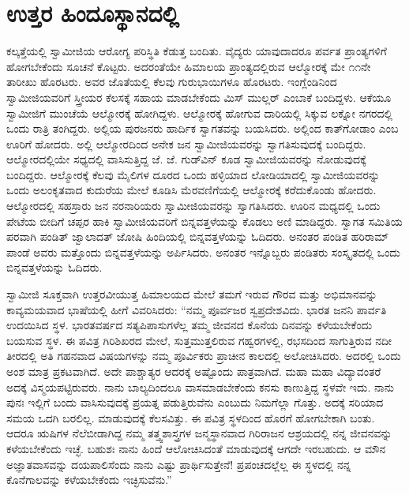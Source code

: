 
\chapter{ಉತ್ತರ ಹಿಂದೂಸ್ಥಾನದಲ್ಲಿ}

 ಕಲ್ಕತ್ತೆಯಲ್ಲಿ ಸ್ವಾಮೀಜಿಯ ಆರೋಗ್ಯ ಪರಿಸ್ಥಿತಿ ಕೆಡುತ್ತ ಬಂದಿತು. ವೈದ್ಯರು ಯಾವುದಾದರೂ ಪರ್ವತ ಪ್ರಾಂತ್ಯಗಳಿಗೆ ಹೋಗಬೇಕೆಂದು ಸೂಚನೆ ಕೊಟ್ಟರು. ಅದರಂತೆಯೇ ಹಿಮಾಲಯ ಪ್ರಾಂತ್ಯದಲ್ಲಿರುವ ಆಲ್ಮೋರಕ್ಕೆ ಮೇ ೧೧ನೇ ತಾರೀಖು ಹೊರಟರು. ಅವರ ಜೊತೆಯಲ್ಲಿ ಕೆಲವು ಗುರುಭಾಯಿಗಳೂ ಹೊರಟರು. ಇಂಗ್ಲೆಂಡಿನಿಂದ ಸ್ವಾಮೀಜಿಯವರಿಗೆ ಸ್ತ್ರೀಯರ ಕೆಲಸಕ್ಕೆ ಸಹಾಯ ಮಾಡಬೇಕೆಂದು ಮಿಸ್ ಮುಲ್ಲರ್ ಎಂಬಾಕೆ ಬಂದಿದ್ದಳು. ಆಕೆಯೂ ಸ್ವಾಮೀಜಿಗೆ ಮುಂಚೆಯೆ ಆಲ್ಮೋರಕ್ಕೆ ಹೋಗಿದ್ದಳು. ಆಲ್ಮೋರಕ್ಕೆ ಹೋಗುವ ದಾರಿಯಲ್ಲಿ ಸಿಕ್ಕುವ ಲಕ್ನೋ ನಗರದಲ್ಲಿ ಒಂದು ರಾತ್ರಿ ತಂಗಿದ್ದರು. ಅಲ್ಲಿಯ ಪುರಜನರು ಹಾರ್ದಿಕ ಸ್ವಾಗತವನ್ನು ಬಯಸಿದರು. ಅಲ್ಲಿಂದ ಕಾತ್‍ಗೋಡಾಂ ಎಂಬ ಊರಿಗೆ ಹೋದರು. ಅಲ್ಲಿ ಆಲ್ಮೋರದಿಂದ ಅನೇಕ ಜನ ಸ್ವಾಮೀಜಿಯವರನ್ನು ಸ್ವಾಗತಿಸುವುದಕ್ಕೆ ಬಂದಿದ್ದರು. ಆಲ್ಮೋರದಲ್ಲಿಯೇ ಸಧ್ಯದಲ್ಲಿ ವಾಸಿಸುತ್ತಿದ್ದ ಜೆ. ಜೆ. ಗುಡ್‍ವಿನ್ ಕೂಡ ಸ್ವಾಮೀಜಿಯವರನ್ನು ನೋಡುವುದಕ್ಕೆ ಬಂದಿದ್ದರು. ಆಲ್ಮೋರಕ್ಕೆ ಕೆಲವು ಮೈಲಿಗಳ ದೂರದ ಒಂದು ಹಳ್ಳಿಯಾದ ಲೋಡಿಯಾದಲ್ಲಿ ಸ್ವಾಮೀಜಿಯವರನ್ನು ಒಂದು ಅಲಂಕೃತವಾದ ಕುದುರೆಯ ಮೇಲೆ ಕೂಡಿಸಿ ಮೆರವಣಿಗೆಯಲ್ಲಿ ಆಲ್ಮೋರಕ್ಕೆ ಕರೆದುಕೊಂಡು ಹೋದರು. ಆಲ್ಮೋರದಲ್ಲಿ ಸಹಸ್ರಾರು ಜನ ನರನಾರಿಯರು ಸ್ವಾಮೀಜಿಯವರನ್ನು ಸ್ವಾಗತಿಸಿದರು. ಊರಿನ ಮಧ್ಯದಲ್ಲಿ ಒಂದು ಪೇಟೆಯ ಬೀದಿಗೆ ಚಪ್ಪರ ಹಾಕಿ ಸ್ವಾಮೀಜಿಯವರಿಗೆ ಬಿನ್ನವತ್ತಳೆಯನ್ನು ಕೊಡಲು ಅಣಿ ಮಾಡಿದ್ದರು. ಸ್ವಾಗತ ಸಮಿತಿಯ ಪರವಾಗಿ ಪಂಡಿತ್ ಜ್ವಾಲಾದತ್ ಜೋಷಿ ಹಿಂದಿಯಲ್ಲಿ ಬಿನ್ನವತ್ತಳೆಯನ್ನು ಓದಿದರು. ಅನಂತರ ಪಂಡಿತ ಹರಿರಾಮ್ ಪಾಂಡೆ ಅವರು ಮತ್ತೊಂದು ಬಿನ್ನವತ್ತಳೆಯನ್ನು ಅರ್ಪಿಸಿದರು. ಅನಂತರ ಇನ್ನೊಬ್ಬರು ಪಂಡಿತರು ಸಂಸ್ಕೃತದಲ್ಲಿ ಒಂದು ಬಿನ್ನವತ್ತಳೆಯನ್ನು ಓದಿದರು. 

 ಸ್ವಾಮೀಜಿ ಸೂಕ್ತವಾಗಿ ಉತ್ತರವೀಯುತ್ತ ಹಿಮಾಲಯದ ಮೇಲೆ ತಮಗೆ ಇರುವ ಗೌರವ ಮತ್ತು ಅಭಿಮಾನವನ್ನು ಕಾವ್ಯಮಯವಾದ ಭಾಷೆಯಲ್ಲಿ ಹೀಗೆ ವಿವರಿಸಿದರು: “ನಮ್ಮ ಪೂರ್ವಜರ ಸ್ವಪ್ರದೇಶವಿದು. ಭಾರತ ಜನನಿ ಪಾರ್ವತಿ ಉದಯಿಸಿದ ಸ್ಥಳ. ಭಾರತವರ್ಷದ ಸತ್ಯಪಿಪಾಸುಗಳೆಲ್ಲ ತಮ್ಮ ಜೀವನದ ಕೊನೆಯ ದಿನವನ್ನು ಕಳೆಯಬೇಕೆಂದು ಬಯಸುವ ಸ್ಥಳ. ಈ ಪವಿತ್ರ ಗಿರಿಶಿಖರದ ಮೇಲೆ, ಸುತ್ತಮುತ್ತಲಿರುವ ಗಹ್ವರಗಳಲ್ಲಿ, ರಭಸದಿಂದ ಸಾಗುತ್ತಿರುವ ನದೀ ತೀರದಲ್ಲಿ ಅತಿ ಗಹನವಾದ ವಿಷಯಗಳನ್ನು ನಮ್ಮ ಪೂರ್ವಿಕರು ಪ್ರಾಚೀನ ಕಾಲದಲ್ಲಿ ಅಲೋಚಿಸಿದರು. ಅದರಲ್ಲಿ ಒಂದು ಅಂಶ ಮಾತ್ರ ಪ್ರಕಟವಾಗಿದೆ. ಅದೇ ಪಾಶ್ಚಾತ್ಯರ ಆದರಕ್ಕೆ ಅಷ್ಟೊಂದು ಪಾತ್ರವಾಗಿದೆ. ಮಹಾ ಮಹಾ ವಿದ್ಯಾವಂತರೆ ಅದಕ್ಕೆ ವಿಸ್ಮಯಪಟ್ಟಿರುವರು. ನಾನು ಬಾಲ್ಯದಿಂದಲೂ ವಾಸಮಾಡಬೇಕೆಂದು ಕನಸು ಕಾಣುತ್ತಿದ್ದ ಸ್ಥಳವೇ ಇದು. ನಾನು ಪುನಃ ಇಲ್ಲಿಗೆ ಬಂದು ವಾಸಿಸುವುದಕ್ಕೆ ಪ್ರಯತ್ನ ಪಡುತ್ತಿರುವೆನು ಎಂಬುದು ನಿಮಗೆಲ್ಲಾ ಗೊತ್ತು. ಅದಕ್ಕೆ ಸರಿಯಾದ ಸಮಯ ಒದಗಿ ಬರಲಿಲ್ಲ. ಮಾಡುವುದಕ್ಕೆ ಕೆಲಸವಿತ್ತು. ಈ ಪವಿತ್ರ ಸ್ಥಳದಿಂದ ಹೊರಗೆ ಹೋಗಬೇಕಾಗಿ ಬಂತು. ಆದರೂ ಋಷಿಗಳ ನೆಲೆಬೀಡಾಗಿದ್ದ ನಮ್ಮ ತತ್ತ್ವಶಾಸ್ತ್ರಗಳ ಜನ್ಮಸ್ಥಾನವಾದ ಗಿರಿರಾಜನ ಆಶ್ರಯದಲ್ಲಿ ನನ್ನ ಜೀವನವನ್ನು ಕಳೆಯಬೇಕೆಂದು ಇಚ್ಛೆ. ಬಹುಶಃ ನಾನು ಹಿಂದೆ ಆಲೋಚಿಸಿದಂತೆ ಮಾಡುವುದಕ್ಕೆ ಆಗದೇ ಇರಬಹುದು. ಆ ಮೌನ ಅಜ್ಞಾತವಾಸವನ್ನು ದಯಪಾಲಿಸೆಂದು ನಾನು ಎಷ್ಟು ಪ್ರಾರ್ಥಿಸುತ್ತೇನೆ! ಪ್ರಪಂಚದಲ್ಲೆಲ್ಲ ಈ ಸ್ಥಳದಲ್ಲಿ ನನ್ನ ಕೊನೆಗಾಲವನ್ನು ಕಳೆಯಬೇಕೆಂದು ಇಚ್ಛಿಸುವೆನು.” 

